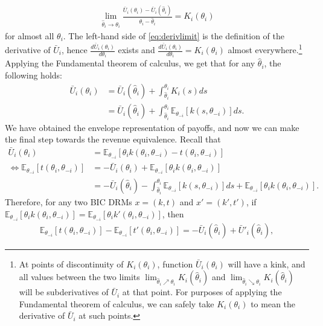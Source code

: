 \documentclass[a4paper]{article}
\begin{document}
	\begin{align}
		\lim_{\hat{\theta}_i \to \theta_i} \frac{\bar{U}_i(\theta_i) - \bar{U}_i(\hat{\theta}_i)}{\theta_i - \hat{\theta}_i} = K_i(\theta_i)
		\label{eq:derivlimit}
	\end{align}
	for almost all $\theta_i$.
	The left-hand side of \eqref{eq:derivlimit} is the definition of the derivative of $\bar{U}_i$, hence $\frac{d\bar{U}_i(\theta_i)}{d \theta_i}$ exists and $\frac{d\bar{U}_i(\theta_i)}{d \theta_i} = K_i(\theta_i)$ almost everywhere.\footnote{At points of discontinuity of $K_i(\theta_i)$, function $\bar{U}_i(\theta_i)$ will have a kink, and all values between the two limits $\lim_{\hat{\theta}_i \nearrow \theta_i} K_i(\hat{\theta}_i)$ and $\lim_{\hat{\theta}_i \searrow \theta_i} K_i(\hat{\theta}_i)$ will be subderivatives of $\bar{U}_i$ at that point. For purposes of applying the Fundamental theorem of calculus, we can safely take $K_i(\theta_i)$ to mean the derivative of $\bar{U}_i$ at such points.}
	Applying the Fundamental theorem of calculus, we get that for any $\hat{\theta}_i$, the following holds:
	\begin{align}
		\bar{U}_i(\theta_i) &= \bar{U}_i(\hat{\theta}_i) + \int_{\hat{\theta}_i}^{\theta_i} K_i(s) ds
		\\
		&= \bar{U}_i(\hat{\theta}_i) + \int_{\hat{\theta}_i}^{\theta_i} \mathbb{E}_{\theta_{-i}}\left[ k(s,\theta_{-i}) \right] ds.
	\end{align}
	We have obtained the envelope representation of payoffs, and now we can make the final step towards the revenue equivalence. Recall that
	\begin{align*}
		\bar{U}_i(\theta_i) &= \mathbb{E}_{\theta_{-i}}\left[ \theta_{i} k(\theta_i,\theta_{-i}) - t(\theta_i,\theta_{-i}) \right]
		\\ \Leftrightarrow
		\mathbb{E}_{\theta_{-i}}\left[ t(\theta_i,\theta_{-i}) \right] &= -\bar{U}_i(\theta_i) + \mathbb{E}_{\theta_{-i}}\left[ \theta_{i} k(\theta_i,\theta_{-i}) \right] 
		\\
		&= -\bar{U}_i(\hat{\theta}_i) - \int_{\hat{\theta}_i}^{\theta_i} \mathbb{E}_{\theta_{-i}}\left[ k(s,\theta_{-i}) \right] ds + \mathbb{E}_{\theta_{-i}}\left[ \theta_{i} k(\theta_i,\theta_{-i}) \right] .
	\end{align*}
	Therefore, for any two BIC DRMs $x=(k,t)$ and $x'=(k',t')$, if $\mathbb{E}_{\theta_{-i}}\left[ \theta_{i} k(\theta_i,\theta_{-i}) \right] = \mathbb{E}_{\theta_{-i}}\left[ \theta_{i} k'(\theta_i,\theta_{-i}) \right]$, then 
	\begin{align*}
		\mathbb{E}_{\theta_{-i}}\left[ t(\theta_i,\theta_{-i}) \right] - \mathbb{E}_{\theta_{-i}}\left[ t'(\theta_i,\theta_{-i}) \right]
		=
		-\bar{U}_i(\hat{\theta}_i) + \bar{U}'_i(\hat{\theta}_i),
	\end{align*}
\end{document}
